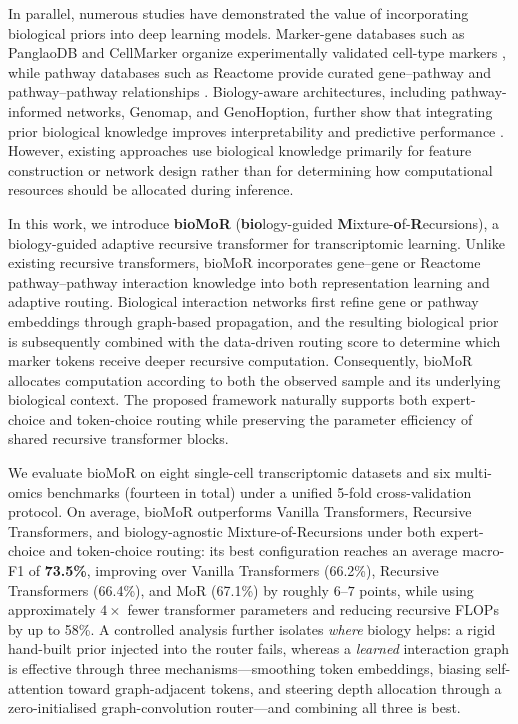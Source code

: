\documentclass[letterpaper]{article}
\begin{document}
In parallel, numerous studies have demonstrated the value of incorporating biological priors into deep learning models. Marker-gene databases such as PanglaoDB and CellMarker organize experimentally validated cell-type markers \cite{franzen2019panglaodb,hu2023cellmarker}, while pathway databases such as Reactome provide curated gene--pathway and pathway--pathway relationships \cite{gillespie2022reactome}. Biology-aware architectures, including pathway-informed networks, Genomap, and GenoHoption, further show that integrating prior biological knowledge improves interpretability and predictive performance \cite{elmarakeby2021biologically,islam2023cartography,cheng2024genohoption}. However, existing approaches use biological knowledge primarily for feature construction or network design rather than for determining how computational resources should be allocated during inference.

In this work, we introduce \textbf{bioMoR} (\textbf{bio}logy-guided \textbf{M}ixture-\textbf{o}f-\textbf{R}ecursions), a biology-guided adaptive recursive transformer for transcriptomic learning. Unlike existing recursive transformers, bioMoR incorporates gene--gene or Reactome pathway--pathway interaction knowledge into both representation learning and adaptive routing. Biological interaction networks first refine gene or pathway embeddings through graph-based propagation, and the resulting biological prior is subsequently combined with the data-driven routing score to determine which marker tokens receive deeper recursive computation. Consequently, bioMoR allocates computation according to both the observed sample and its underlying biological context. The proposed framework naturally supports both expert-choice and token-choice routing while preserving the parameter efficiency of shared recursive transformer blocks.

We evaluate bioMoR on eight single-cell transcriptomic datasets and six multi-omics benchmarks (fourteen in total) under a unified 5-fold cross-validation protocol. On average, bioMoR outperforms Vanilla Transformers, Recursive Transformers, and biology-agnostic Mixture-of-Recursions under both expert-choice and token-choice routing: its best configuration reaches an average macro-F1 of \textbf{73.5\%}, improving over Vanilla Transformers (66.2\%), Recursive Transformers (66.4\%), and MoR (67.1\%) by roughly $6$--$7$ points, while using approximately $4\times$ fewer transformer parameters and reducing recursive FLOPs by up to 58\%. A controlled analysis further isolates \emph{where} biology helps: a rigid hand-built prior injected into the router fails, whereas a \emph{learned} interaction graph is effective through three mechanisms---smoothing token embeddings, biasing self-attention toward graph-adjacent tokens, and steering depth allocation through a zero-initialised graph-convolution router---and combining all three is best.
\end{document}
